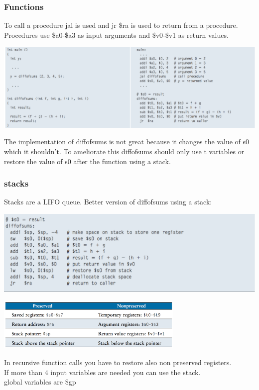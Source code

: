 		\subsubsection{Functions}
		To call a procedure jal is used and jr \$ra is used to return from a procedure. Procedures use \$a0-\$a3 as input arguments and \$v0-\$v1 as return values.
		\begin{center}
				\includegraphics[width = 18cm]{images/function}
		\end{center}
		The implementation of diffofsums is not great because it changes the value of s0 which it shouldn't. To ameliorate this diffofsums should only use t variables or restore the value of s0 after the function using a stack.
		\subsubsection{stacks}
		Stacks are a LIFO queue. Better version of diffofsums using a stack:
		\begin{center}
				\includegraphics[width = 18cm]{images/stack}
		\end{center}
		\begin{center}
				\includegraphics[width = 9cm]{images/preserved}
		\end{center}
		In recursive function calls you have to restore also non preserved registers.\\
		If more than 4 input variables are needed you can use the stack.\\
		global variables are \$gp
